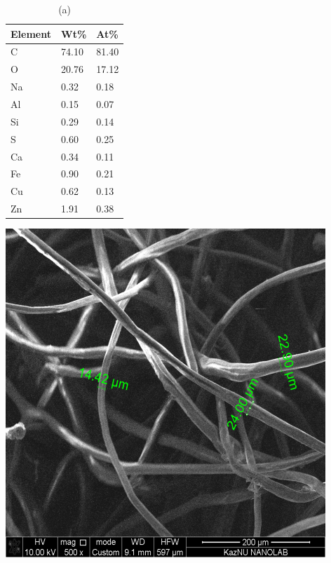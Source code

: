 \begin{table}[H]
\centering
\begin{minipage}{0.45\textwidth}
\centering
\begin{tabular}{|l|l|l|}
\hline
Element & Wt\% & At\% \\ \hline
C & 74.10 & 81.40 \\ \hline
O & 20.76 & 17.12 \\ \hline
Na & 0.32 & 0.18 \\ \hline
Al & 0.15 & 0.07 \\ \hline
Si & 0.29 & 0.14 \\ \hline
S & 0.60 & 0.25 \\ \hline
Ca & 0.34 & 0.11 \\ \hline
Fe & 0.90 & 0.21 \\ \hline
Cu & 0.62 & 0.13 \\ \hline
Zn & 1.91 & 0.38 \\ \hline
\end{tabular}%
\end{minipage}\hfill
\begin{minipage}{0.45\textwidth}
\centering
\includegraphics[width=\textwidth]{assets/1009}
\end{minipage}
\caption*{(a)}
\end{table}

